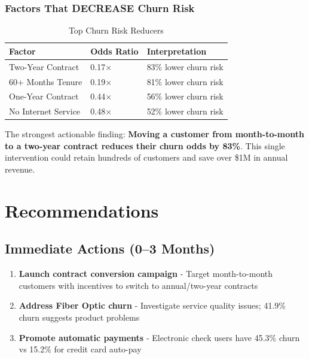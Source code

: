 \documentclass[11pt,a4paper]{article}
\begin{document}
\subsubsection{Factors That DECREASE Churn Risk}

\begin{table}[H]
\centering
\begin{tabular}{p{4.5cm} p{2.5cm} p{4.5cm}}
\toprule
\rowcolor{primary!10}
\textbf{Factor} & \textbf{Odds Ratio} & \textbf{Interpretation} \\
\midrule
\rowcolor{retentiongreen!15}
Two-Year Contract & 0.17$\times$ & 83\% lower churn risk \\
60+ Months Tenure & 0.19$\times$ & 81\% lower churn risk \\
One-Year Contract & 0.44$\times$ & 56\% lower churn risk \\
No Internet Service & 0.48$\times$ & 52\% lower churn risk \\
\bottomrule
\end{tabular}
\caption{Top Churn Risk Reducers}
\end{table}

\begin{tcolorbox}[
    colback=churnred!5,
    colframe=churnred!60,
    title=\textbf{Statistical Conclusion},
    fonttitle=\bfseries,
    arc=6pt
]
The strongest actionable finding: \textbf{Moving a customer from month-to-month to a two-year contract reduces their churn odds by 83\%}. This single intervention could retain hundreds of customers and save over \$1M in annual revenue.
\end{tcolorbox}

\section{Recommendations}

\subsection{Immediate Actions (0--3 Months)}

\begin{enumerate}[label=\color{churnred}\textbf{\theenumi.}, leftmargin=*]
    \item \textbf{Launch contract conversion campaign} - Target month-to-month customers with incentives to switch to annual/two-year contracts
    \item \textbf{Address Fiber Optic churn} - Investigate service quality issues; 41.9\% churn suggests product problems
    \item \textbf{Promote automatic payments} - Electronic check users have 45.3\% churn vs 15.2\% for credit card auto-pay
\end{enumerate}
\end{document}
